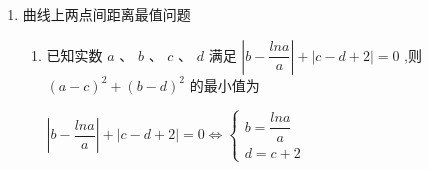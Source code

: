 \begin{enumerate}
\begin{enumerate}
\begin{jieda}
\begin{enumerate}
                曲线 $y = f\left( x\right)$ 在点 $A$ 处的切线为: $y - {e}^{{x}_{1} - a} = {e}^{{x}_{1} - a}\left( {x - {x}_{1}}\right)$
                
                与曲线 $y = g\left( x\right)$ 相切于点 $B$ ,则 $\left\{  \begin{matrix} {e}^{{x}_{1} - a} = \dfrac{1}{{x}_{2}} \\  \ln {x}_{2} - b - {e}^{{x}_{1} - a} = {e}^{{x}_{1} - a}\left( {{x}_{2} - {x}_{1}}\right) \end{matrix}\right.$
                
                由上式得: ${x}_{1} - a = \ln \left(\dfrac{1}{{x}_{2}}\right) =  - \ln {x}_{2}$ ，则 $\ln {x}_{2} = a - {x}_{1}$
                
                将 ${e}^{{x}_{1} - a} = \dfrac{1}{{x}_{2}}\text{ 、 }\ln {x}_{2} = a - {x}_{1}$ 代入下式得: $a - {x}_{1} - b - \dfrac{1}{{x}_{2}} = \dfrac{1}{{x}_{2}}\left( {{x}_{2} - {x}_{1}}\right)$ ，
                
                整理得: $\left( {{x}_{1} - 1}\right) \left( {{x}_{2} - 1}\right)  = 0$

            \end{enumerate}
        \end{jieda}
    \end{enumerate}

    \item 曲线上两点间距离最值问题
    \begin{enumerate}
        \item 已知实数 ${a}$ 、 ${b}$ 、 ${c}$ 、 ${d}$ 满足 $\left| {{b} - \dfrac{{{lna}} }{{a}}}\right|  + \left| {{c} - {d} + 2}\right|  = 0$ ,则 ${\left( {a} - {c}\right) }^{2} + {\left( {b} - {d}\right) }^{2}$ 的最小值为
        \begin{jieda}
            $\left| {{b} - \dfrac{ {{lna}} }{{a}}}\right|  + \left| {{c} - {d} + 2}\right|  = 0 \Longleftrightarrow \left\{\begin{array}{l}
                 b = \dfrac{lna}{a}  \\
                 d = c+2
            \end{array}\right.$


\end{jieda}
\end{enumerate}
\end{enumerate}
